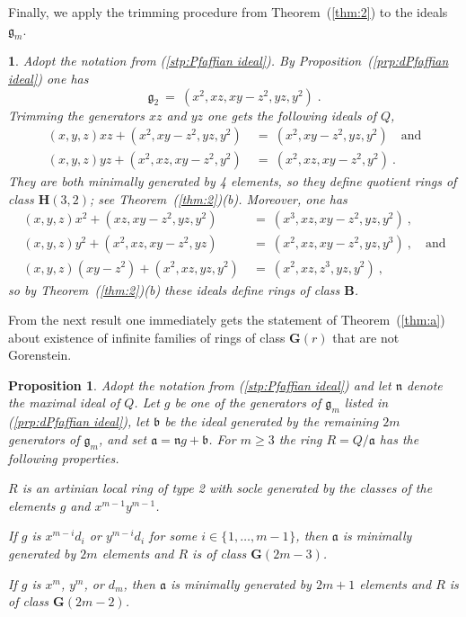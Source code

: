 \documentclass{amsart}
\theoremstyle{bfupright head,upright body}
\theoremstyle{fixed bf head,slanted body}
\newtheorem{prp}[res]{Proposition}      \newtheorem*{prp*}{Proposition}
\theoremstyle{fixed bf head,upright body}
\theoremstyle{numbered paragraph}
\newtheorem{ipg}[res]{}
\newlength{\thmlistleft}        %
\newlength{\thmlistright}       %
\newlength{\thmlistpartopsep}   %
\newlength{\thmlisttopsep}      %
\newlength{\thmlistparsep}      %
\newlength{\thmlistitemsep}     %
\newcounter{prt}
\newenvironment{prt}{\begin{list}{\upshape (\alph{prt})}%
    {\usecounter{prt}%
      \setlength{\leftmargin}{\thmlistleft}%
      \setlength{\labelwidth}{\thmlistleft}%
      \setlength{\rightmargin}{\thmlistright}%
      \setlength{\partopsep}{\thmlistpartopsep}%
      \setlength{\topsep}{\thmlisttopsep}%
      \setlength{\parsep}{\thmlistparsep}%
      \setlength{\itemsep}{\thmlistitemsep}}}%
  {\end{list}}%
\newcommand{\pgref}[1]{(\ref{#1})}
\newcommand{\thmref}[2][Theorem~]{#1\pgref{thm:#2}}
\newcommand{\prpref}[2][Proposition~]{#1\pgref{prp:#2}}
\newcommand{\set}[2][\mspace{1mu}]{\{#1 #2 #1\}}
\newcommand{\deq}{\:=\:}
\newcommand{\n}{\mathfrak{n}}
\newcommand{\clB}{\mathbf{B}}
\newcommand{\clG}[1]{\mathbf{G}(#1)}
\newcommand{\clH}[1]{\mathbf{H}(#1)}
\newcommand{\fa}{\mathfrak{a}}
\newcommand{\fb}{\mathfrak{b}}
\newcommand{\fg}{\mathfrak{g}}
\numberwithin{equation}{res}
\begin{document}
Finally, we apply the trimming procedure from \thmref{2} to the ideals
$\fg_m$.  \enlargethispage*{\baselineskip}
\begin{ipg}
  \label{rmk:a}
  Adopt the notation from {\rm \pgref{stp:Pfaffian ideal}}. By
  \prpref{dPfaffian ideal} one has
  \begin{equation*}
    \fg_2 \deq (x^2, xz, xy-z^2, yz, y^2)\;.
  \end{equation*}
  Trimming the generators $xz$ and $yz$ one gets the following ideals
  of $Q$,
  \begin{align*}
    (x,y,z)xz + (x^2, xy-z^2, yz, y^2) &\deq (x^2, xy-z^2, yz, y^2)\quad\text{and}\\
    (x,y,z)yz + (x^2, xz, xy-z^2, y^2) &\deq (x^2, xz, xy-z^2, y^2)\:.
  \end{align*}
  They are both minimally generated by 4 elements, so they define
  quotient rings of class $\clH{3,2}$; see \thmref{2}(b).  Moreover,
  one has
  \begin{align*}
    (x,y,z)x^2 + (xz, xy-z^2, yz, y^2) &\deq (x^3, xz, xy-z^2, yz, y^2)\:,\\
    (x,y,z)y^2 + (x^2,xz, xy-z^2, yz) &\deq (x^2, xz, xy-z^2, yz,
    y^3)\:,
    \quad\text{and}\\
    (x,y,z)(xy-z^2) + (x^2, xz, yz, y^2) &\deq (x^2, xz, z^3, yz,
    y^2)\:,
  \end{align*}
  so by \thmref{2}(b) these ideals define rings of class $\clB$.
\end{ipg}

From the next result one immediately gets the statement of \thmref{a}
about existence of infinite families of rings of class $\clG{r}$ that
are not Gorenstein.

\begin{prp}
  \label{prp:a}
  Adopt the notation from {\rm \pgref{stp:Pfaffian ideal}} and let
  $\n$ denote the maximal ideal of $Q$.  Let $g$ be one of the
  generators of $\fg_m$ listed in {\rm \pgref{prp:dPfaffian ideal}},
  let $\fb$ be the ideal generated by the remaining $2m$ generators of
  $\fg_m$, and set $\fa = \n g + \fb$.  For $m \ge 3$ the ring
  $R=Q/\fa$ has the following properties.
  \begin{prt}
  \item $R$ is an artinian local ring of type 2 with socle generated
    by the classes of the elements $g$ and $x^{m-1}y^{m-1}$.
  \item If $g$ is $x^{m-i}d_i$ or $y^{m-i}d_i$ for some
    $i\in\set{1,\ldots,m-1}$, then $\fa$ is minimally generated by
    $2m$ elements and $R$ is of class $\clG{2m-3}$.
  \item If $g$ is $x^m$, $y^m$, or $d_m$, then $\fa$ is minimally
    generated by $2m+1$ elements and $R$ is of class $\clG{2m-2}$.
  \end{prt}
\end{prp}
\end{document}
